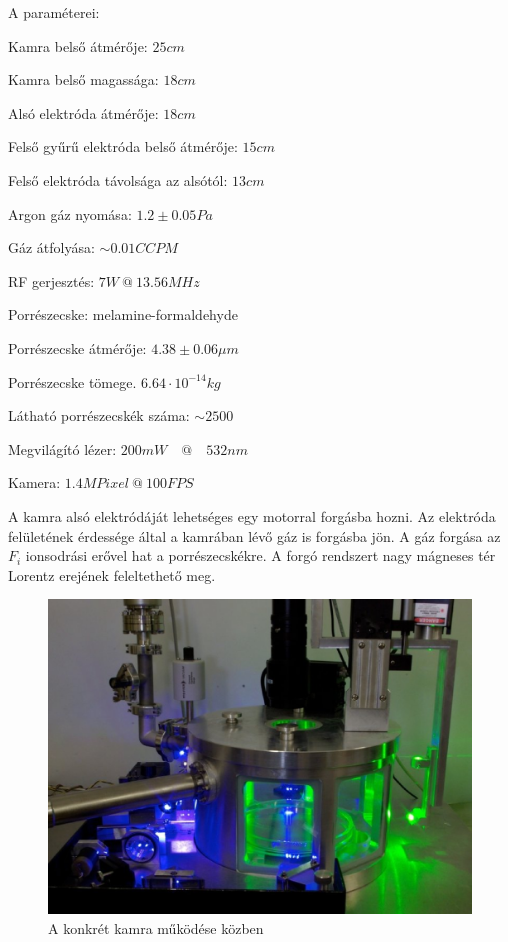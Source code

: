 	\noindent A paraméterei:
	\begin{myitemize*}
		\item Kamra belső átmérője: $25cm$
		\item Kamra belső magassága: $18cm$
		\item Alsó elektróda átmérője: $18cm$
		\item Felső gyűrű elektróda belső átmérője: $15cm$
		\item Felső elektróda távolsága az alsótól: $13cm$
		\item Argon gáz nyomása: $1.2\pm0.05 Pa$
		\item Gáz átfolyása: $\sim 0.01 CCPM$
		\item RF gerjesztés: $7W\ @ \ 13.56 MHz$
		\item Porrészecske: melamine-formaldehyde
		\item Porrészecske átmérője: $4.38\pm 0.06 \mu m$
		\item Porrészecske tömege. $6.64\cdot10^{-14} kg$
		\item Látható porrészecskék száma: $\sim 2500$
		\item Megvilágító lézer: $200mW\quad @ \quad 532nm$
		\item Kamera: $1.4 MPixel\ @\ 100 FPS$
	\end{myitemize*}
	A kamra alsó elektródáját lehetséges egy motorral forgásba hozni. Az elektróda felületének érdessége által a kamrában
	lévő gáz is forgásba jön. A gáz forgása az $F_i$ ionsodrási erővel hat a porrészecskékre.
	A forgó rendszert nagy mágneses tér Lorentz erejének feleltethető meg.
	\begin{figure}[H]
		\centering
		\includegraphics[width=0.9\columnwidth]{figures/eps/dusty2.eps}
		\caption{A konkrét kamra működése közben} 
		\label{fig:kamra}
	\end{figure}
	
